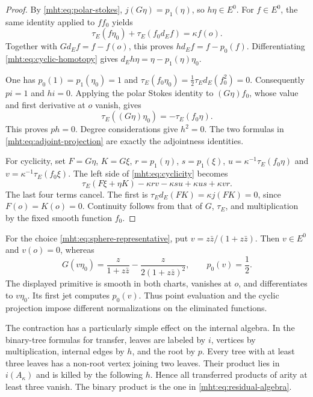 \begin{proof}
By \eqref{mht:eq:polar-stokes}, $j(G\eta)=p_1(\eta)$, so $h\eta\in E^0$.
For $f\in E^0$, the same identity applied to $ff_0$ yields
\[
 \tau_E(f\eta_0)+\tau_E(f_0d_Ef)=\kappa f(o).
\]
Together with $Gd_Ef=f-f(o)$, this proves $hd_Ef=f-p_0(f)$.
Differentiating \eqref{mht:eq:cyclic-homotopy} gives
$d_Eh\eta=\eta-p_1(\eta)\eta_0$.

One has $p_0(1)=p_1(\eta_0)=1$ and
$\tau_E(f_0\eta_0)=\frac12\tau_Ed_E(f_0^2)=0$.
Consequently $pi=1$ and $hi=0$. Applying the polar Stokes identity to
$(G\eta)f_0$, whose value and first derivative at $o$ vanish, gives
\[
 \tau_E((G\eta)\eta_0)=-\tau_E(f_0\eta).
\]
This proves $ph=0$. Degree considerations give $h^2=0$.
The two formulas in \eqref{mht:eq:adjoint-projection} are exactly the
adjointness identities.

For cyclicity, set $F=G\eta$, $K=G\xi$,
$r=p_1(\eta)$, $s=p_1(\xi)$,
$u=\kappa^{-1}\tau_E(f_0\eta)$ and
$v=\kappa^{-1}\tau_E(f_0\xi)$. The left side of
\eqref{mht:eq:cyclicity} becomes
\[
 \tau_E(F\xi+\eta K)-\kappa rv-\kappa su+\kappa us+\kappa vr.
\]
The last four terms cancel. The first is
$\tau_Ed_E(FK)=\kappa j(FK)=0$, since $F(o)=K(o)=0$.
Continuity follows from that of $G$, $\tau_E$, and multiplication by
the fixed smooth function $f_0$.
\end{proof}

\begin{example}\label{mht:ex:projection-not-evaluation}
For the choice \eqref{mht:eq:sphere-representative}, put
$v=z\bar z/(1+z\bar z)$. Then $v\in E^0$ and $v(o)=0$, whereas
\[
 G(v\eta_0)=\frac{z}{1+z\bar z}
                -\frac{z}{2(1+z\bar z)^2},\qquad
 p_0(v)=\frac12.
\]
The displayed primitive is smooth in both charts, vanishes at $o$,
and differentiates to $v\eta_0$. Its first jet computes $p_0(v)$.
Thus point evaluation and the cyclic projection impose different
normalizations on the eliminated functions.
\end{example}

The contraction has a particularly simple effect on the internal
algebra. In the binary-tree formulas for transfer, leaves are labeled
by $i$, vertices by multiplication, internal edges by $h$, and the root
by $p$. Every tree with at least three leaves has a non-root vertex
joining two leaves. Their product lies in $i(A_\kappa)$ and is killed by
the following $h$. Hence all transferred products of arity at least
three vanish. The binary product is the one in
\eqref{mht:eq:residual-algebra}.


